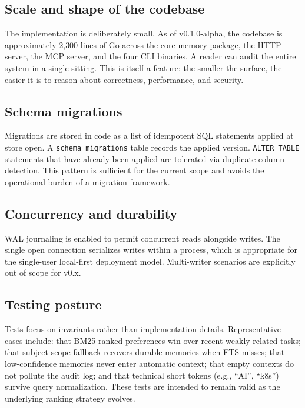 \documentclass[11pt,a4paper]{article}
\begin{document}
\subsection{Scale and shape of the codebase}

The implementation is deliberately small. As of v0.1.0-alpha, the codebase is approximately 2{,}300 lines of Go across the core memory package, the HTTP server, the MCP server, and the four CLI binaries. A reader can audit the entire system in a single sitting. This is itself a feature: the smaller the surface, the easier it is to reason about correctness, performance, and security.

\subsection{Schema migrations}

Migrations are stored in code as a list of idempotent SQL statements applied at store open. A \texttt{schema\_migrations} table records the applied version. \texttt{ALTER TABLE} statements that have already been applied are tolerated via duplicate-column detection. This pattern is sufficient for the current scope and avoids the operational burden of a migration framework.

\subsection{Concurrency and durability}

WAL journaling is enabled to permit concurrent reads alongside writes. The single open connection serializes writes within a process, which is appropriate for the single-user local-first deployment model. Multi-writer scenarios are explicitly out of scope for v0.x.

\subsection{Testing posture}

Tests focus on invariants rather than implementation details. Representative cases include: that BM25-ranked preferences win over recent weakly-related tasks; that subject-scope fallback recovers durable memories when FTS misses; that low-confidence memories never enter automatic context; that empty contexts do not pollute the audit log; and that technical short tokens (e.g., ``AI'', ``k8s'') survive query normalization. These tests are intended to remain valid as the underlying ranking strategy evolves.
\end{document}
